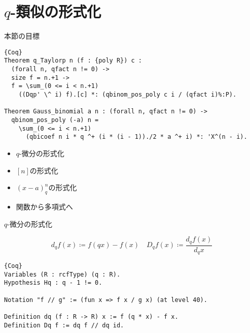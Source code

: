 \documentclass[dvipdfmx,cjk]{beamer}
\theoremstyle{mystyle}
\newcommand{\0}{\textbf{0}}
\begin{document}

\section{$q$-類似の形式化}

\begin{frame}
  \tableofcontents[currentsection] 
\end{frame}

\begin{frame}[fragile]{本節の目標} \pause
	\begin{lstlisting}{Coq}
Theorem q_Taylorp n (f : {poly R}) c :
  (forall n, qfact n != 0) ->
  size f = n.+1 ->
  f = \sum_(0 <= i < n.+1)
    ((Dqp' \^ i) f).[c] *: (qbinom_pos_poly c i / (qfact i)%:P).
    
Theorem Gauss_binomial a n : (forall n, qfact n != 0) ->
  qbinom_pos_poly (-a) n =
    \sum_(0 <= i < n.+1)
      (qbicoef n i * q ^+ (i * (i - 1))./2 * a ^+ i) *: 'X^(n - i). \end{lstlisting} \pause
	\begin{itemize}
		\item $q$-微分の形式化 \pause
		\item $[n]$の形式化 \pause
		\item $(x - a)^n_q$の形式化 \pause
		\item 関数から多項式へ
	\end{itemize}
\end{frame}

\begin{frame}[fragile]{$q$-微分の形式化}
	\begin{screen}
		\[
			d_q f (x) \coloneqq f(qx) - f(x) \quad D_q f (x) \coloneqq \frac{d_q f(x)}{d_q x}
		\]
	\end{screen} \pause
	\begin{lstlisting}{Coq}
Variables (R : rcfType) (q : R).
Hypothesis Hq : q - 1 != 0.

Notation "f // g" := (fun x => f x / g x) (at level 40).

Definition dq (f : R -> R) x := f (q * x) - f x.
Definition Dq f := dq f // dq id. \end{lstlisting}
\end{frame}
\end{document}

